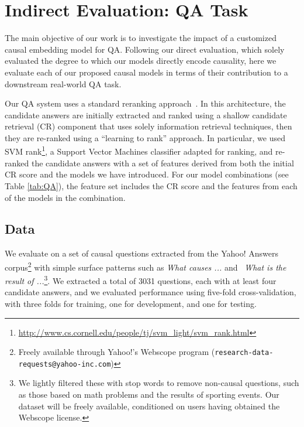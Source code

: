 \section{Indirect Evaluation: QA Task}
\label{sec-emnlp2016:indirecteval}

The main objective of our work is to investigate the impact of a customized causal embedding model for QA. Following our direct evaluation, which solely evaluated the degree to which our models directly encode causality, here we evaluate each of our proposed causal models in terms of their contribution to a downstream real-world QA task.

Our QA system uses a standard reranking approach~\cite{jansen14}.
In this architecture, the candidate answers are initially extracted and ranked using a shallow candidate retrieval (CR) component that uses solely information retrieval techniques, then they are re-ranked using a ``learning to rank'' approach.
In particular, we used SVM rank\footnote{ \url{http://www.cs.cornell.edu/people/tj/svm_light/svm_rank.html}}, a Support Vector Machines classifier adapted for ranking, and re-ranked the candidate answers with a set of features derived from both the initial CR score and the models we have introduced. For our model combinations (see Table \ref{tab:QA}), the feature set includes the CR score and the features from each of the models in the combination.
%

\subsection{Data}

We evaluate on a set of causal questions extracted from the Yahoo! Answers corpus\footnote{Freely available through Yahoo!'s Webscope
program ({\scriptsize {\tt research-data-requests@yahoo-inc.com}})} with simple surface patterns such as \emph{What causes ...} and ~\emph{What is the result of ...}\footnote{We lightly filtered these with stop words to remove non-causal questions, such as those based on math problems and the results of sporting events. Our dataset will be freely available, conditioned on users having obtained the Webscope license.}.
We extracted a total of 3031 questions, each with at least four candidate answers, and we evaluated performance using five-fold cross-validation, with three folds for training, one for development, and one for testing. 

